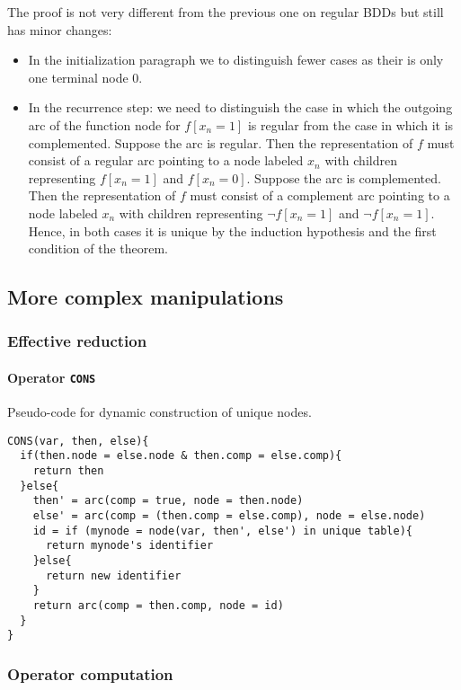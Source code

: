 \documentclass[a4paper,10pt]{article}
\begin{document}
The proof is not very different from the previous one on regular BDDs but still has minor changes:\begin{itemize}
\item In the initialization paragraph we to distinguish fewer cases as their is only one terminal node 0.
\item In the recurrence step: we need to distinguish the case in which the outgoing arc of the function node for $f[x_n=1]$ is regular from the case in which it is complemented.
Suppose the arc is regular.
Then the representation of $f$ must consist of a regular arc pointing to a node labeled $x_n$ with children representing $f[x_n=1]$ and $f[x_n=0]$.
Suppose the arc is complemented.
Then the representation of $f$ must consist of a complement arc pointing to a node labeled $x_n$ with children representing $\lnot f[x_n=1]$ and $\lnot f[x_n=1]$.
Hence, in both cases it is unique by the induction hypothesis and the first condition of the theorem.
\end{itemize}




\subsection{More complex manipulations}
\subsubsection{Effective reduction}

\paragraph{Operator \texttt{CONS}\\}

Pseudo-code for dynamic construction of unique nodes.

\begin{lstlisting}
CONS(var, then, else){
  if(then.node = else.node & then.comp = else.comp){
    return then
  }else{
    then' = arc(comp = true, node = then.node)
    else' = arc(comp = (then.comp = else.comp), node = else.node)
    id = if (mynode = node(var, then', else') in unique table){
      return mynode's identifier
    }else{
      return new identifier
    }
  	return arc(comp = then.comp, node = id)
  }
}
\end{lstlisting}

\subsubsection{Operator computation}
\end{document}
